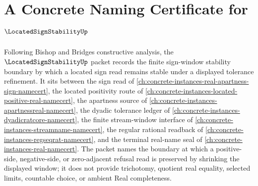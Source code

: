 \chapter{A Concrete Naming Certificate for $\LocatedSignStabilityUp$}
\label{ch:concrete-instances-located-sign-stability-namecert}

Following Bishop and Bridges constructive analysis, the $\LocatedSignStabilityUp$ packet records the finite sign-window stability boundary by which a located sign read remains stable under a displayed tolerance refinement. It sits between the sign read of \autoref{ch:concrete-instances-real-apartness-sign-namecert}, the located positivity route of \autoref{ch:concrete-instances-located-positive-real-namecert}, the apartness source of \autoref{ch:concrete-instances-apartnessreal-namecert}, the dyadic tolerance ledger of \autoref{ch:concrete-instances-dyadicratcore-namecert}, the finite stream-window interface of \autoref{ch:concrete-instances-streamname-namecert}, the regular rational readback of \autoref{ch:concrete-instances-regseqrat-namecert}, and the terminal real-name seal of \autoref{ch:concrete-instances-real-namecert}. The packet names the boundary at which a positive-side, negative-side, or zero-adjacent refusal read is preserved by shrinking the displayed window; it does not provide trichotomy, quotient real equality, selected limits, countable choice, or ambient Real completeness.


